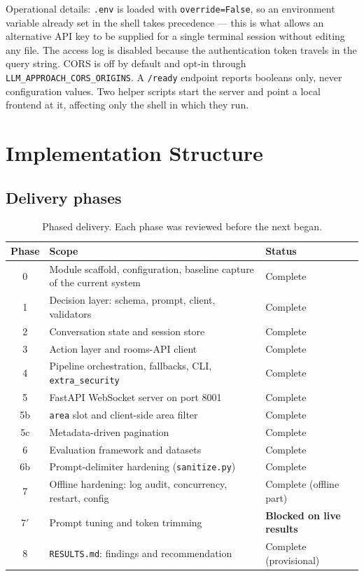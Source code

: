 \documentclass[11pt,a4paper]{article}
\newcommand{\fn}[1]{\texttt{\small #1}}
\begin{document}
Operational details: \fn{.env} is loaded with \fn{override=False}, so an environment variable
already set in the shell takes precedence --- this is what allows an alternative API key to be
supplied for a single terminal session without editing any file. The access log is disabled
because the authentication token travels in the query string. CORS is off by default and
opt-in through \fn{LLM\_APPROACH\_CORS\_ORIGINS}. A \fn{/ready} endpoint reports booleans
only, never configuration values. Two helper scripts start the server and point a local
frontend at it, affecting only the shell in which they run.

\section{Implementation Structure}

\subsection{Delivery phases}

\begin{table}[H]
\centering
\caption{Phased delivery. Each phase was reviewed before the next began.}
\small
\begin{tabularx}{\textwidth}{@{}c>{\raggedright\arraybackslash}X l@{}}
\toprule
\textbf{Phase} & \textbf{Scope} & \textbf{Status}\\
\midrule
0  & Module scaffold, configuration, baseline capture of the current system & Complete\\
1  & Decision layer: schema, prompt, client, validators & Complete\\
2  & Conversation state and session store & Complete\\
3  & Action layer and rooms-API client & Complete\\
4  & Pipeline orchestration, fallbacks, CLI, \fn{extra\_security} & Complete\\
5  & FastAPI WebSocket server on port 8001 & Complete\\
5b & \fn{area} slot and client-side area filter & Complete\\
5c & Metadata-driven pagination & Complete\\
6  & Evaluation framework and datasets & Complete\\
6b & Prompt-delimiter hardening (\fn{sanitize.py}) & Complete\\
7  & Offline hardening: log audit, concurrency, restart, config & Complete (offline part)\\
7$'$ & Prompt tuning and token trimming & \textbf{Blocked on live results}\\
8  & \fn{RESULTS.md}: findings and recommendation & Complete (provisional)\\
\bottomrule
\end{tabularx}
\end{table}
\end{document}

